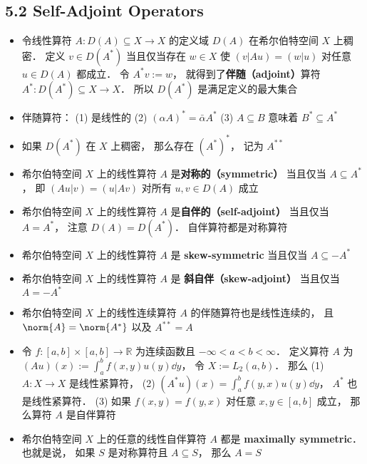 \subsection{5.2 Self-Adjoint Operators}
\begin{itemize}
\item 令线性算符 $A: D(A) \subseteq X \to X$ 的定义域 $D(A)$ 在希尔伯特空间 $X$ 上稠密． 定义 $v \in D(A^*)$ 当且仅当存在 $w\in X$ 使 $(v|Au) = (w|u)$ 对任意 $u\in D(A)$ 都成立． 令 $A^*v := w$， 就得到了\textbf{伴随（adjoint）}算符 $A^*: D(A^*) \subseteq X \to X$． 所以 $D(A^*)$ 是满足定义的最大集合

\item 伴随算符： (1) 是线性的 (2) $(\alpha A)^* = \bar \alpha A^*$ (3) $A \subseteq B$ 意味着 $B^* \subseteq A^*$

\item 如果 $D(A^*)$ 在 $X$ 上稠密， 那么存在 $(A^*)^*$， 记为 $A^{**}$

\item 希尔伯特空间 $X$ 上的线性算符 $A$ 是\textbf{对称的（symmetric）} 当且仅当 $A \subseteq A^*$， 即 $(Au|v)=(u|Av)$ 对所有 $u, v\in D(A)$ 成立

\item 希尔伯特空间 $X$ 上的线性算符 $A$ 是\textbf{自伴的（self-adjoint）} 当且仅当 $A = A^*$， 注意 $D(A) = D(A^*)$． 自伴算符都是对称算符

\item 希尔伯特空间 $X$ 上的线性算符 $A$ 是 \textbf{skew-symmetric} 当且仅当 $A \subseteq -A^*$

\item 希尔伯特空间 $X$ 上的线性算符 $A$ 是 \textbf{斜自伴（skew-adjoint）} 当且仅当 $A = -A^*$

\item 希尔伯特空间 $X$ 上的线性连续算符 $A$ 的伴随算符也是线性连续的， 且 $\norm{A} = \norm{A^*}$ 以及 $A^{**} = A$

\item 令 $f:[a, b]\times[a,b]\to\mathbb R$ 为连续函数且 $-\infty< a < b < \infty$． 定义算符 $A$ 为 $(Au)(x) := \int_a^b f(x, y)u(y)\dd{y}$， 令 $X := L_2(a, b)$． 那么 (1) $A: X\to X$ 是线性紧算符， (2) $(A^*u)(x) = \int_a^b f(y, x) u(y)\dd{y}$， $A^*$ 也是线性紧算符． (3) 如果 $f(x, y) = f(y, x)$ 对任意 $x, y\in[a, b]$ 成立， 那么算符 $A$ 是自伴算符

\item 希尔伯特空间 $X$ 上的任意的线性自伴算符 $A$ 都是 \textbf{maximally symmetric}． 也就是说， 如果 $S$ 是对称算符且 $A \subseteq S$， 那么 $A = S$


\end{itemize}
